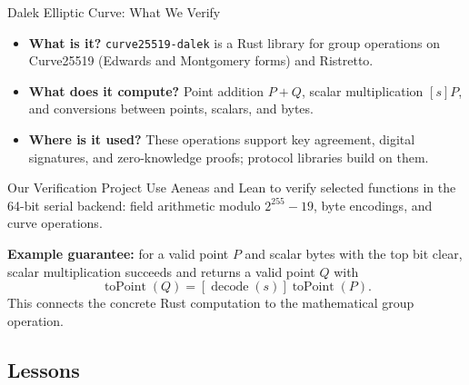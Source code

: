 \documentclass[aspectratio=169,xcolor=dvipsnames]{beamer}
\begin{document}
\begin{frame}{Dalek Elliptic Curve: What We Verify}
    \small
    \begin{itemize}
        \item \textbf{What is it?} \texttt{curve25519-dalek} is a Rust library for group operations on Curve25519 (Edwards and Montgomery forms) and Ristretto.
        \item \textbf{What does it compute?} Point addition $P+Q$, scalar multiplication $[s]P$, and conversions between points, scalars, and bytes.
        \item \textbf{Where is it used?} These operations support key agreement, digital signatures, and zero-knowledge proofs; protocol libraries build on them.
    \end{itemize}
    \begin{block}{Our Verification Project}
        Use Aeneas and Lean to verify selected functions in the 64-bit serial backend:
        field arithmetic modulo $2^{255}-19$, byte encodings, and curve operations.
    \end{block}
    \footnotesize
    \textbf{Example guarantee:} for a valid point $P$ and scalar bytes with the top bit clear,
    scalar multiplication succeeds and returns a valid point $Q$ with
    \[
        \operatorname{toPoint}(Q)
        = [\operatorname{decode}(s)]\operatorname{toPoint}(P).
    \]
    This connects the concrete Rust computation to the mathematical group operation.
\end{frame}


\subsection{Lessons}

\end{document}
